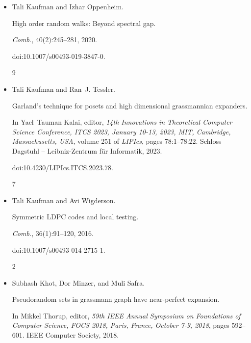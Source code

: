 \begin{itemize}
In \emph{Proceedings of the 50th Annual ACM SIGACT Symposium on
Theory of Computing, STOC 2018, Los Angeles, CA, USA, June 25-29, 2018},
pages 773–786, 2018.


doi:10.1145/3188745.3188782.


3, 7, 9, 14, 15




\item[] 
[20]

Tali Kaufman and Izhar Oppenheim.


High order random walks: Beyond spectral gap.


\emph{Comb.}, 40(2):245–281, 2020.


doi:10.1007/s00493-019-3847-0.


9




\item[] 
[21]

Tali Kaufman and Ran J. Tessler.


Garland’s technique for posets and high dimensional grassmannian
expanders.


In Yael Tauman Kalai, editor, \emph{14th Innovations in Theoretical
Computer Science Conference, ITCS 2023, January 10-13, 2023, MIT,
Cambridge, Massachusetts, USA}, volume 251 of \emph{LIPIcs}, pages
78:1–78:22. Schloss Dagstuhl – Leibniz-Zentrum für Informatik, 2023.


doi:10.4230/LIPIcs.ITCS.2023.78.


7




\item[] 
[22]

Tali Kaufman and Avi Wigderson.


Symmetric LDPC codes and local testing.


\emph{Comb.}, 36(1):91–120, 2016.


doi:10.1007/s00493-014-2715-1.


2




\item[] 
[23]

Subhash Khot, Dor Minzer, and Muli Safra.


Pseudorandom sets in grassmann graph have near-perfect expansion.


In Mikkel Thorup, editor, \emph{59th IEEE Annual Symposium on
Foundations of Computer Science, FOCS 2018, Paris, France, October 7-9,
2018}, pages 592–601. IEEE Computer Society, 2018.



\end{itemize}
